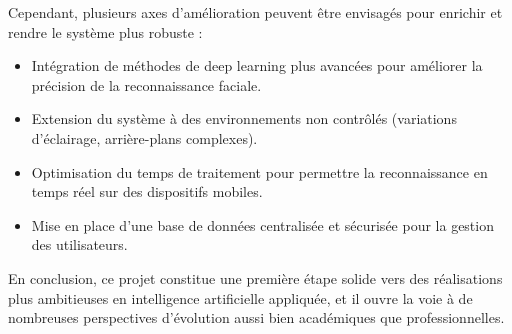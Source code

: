 \documentclass[a4paper,12pt]{report} %
\begin{document}
Cependant, plusieurs axes d'amélioration peuvent être envisagés pour enrichir et rendre le système plus robuste :

\begin{itemize}
    \item Intégration de méthodes de deep learning plus avancées pour améliorer la précision de la reconnaissance faciale.
    \item Extension du système à des environnements non contrôlés (variations d'éclairage, arrière-plans complexes).
    \item Optimisation du temps de traitement pour permettre la reconnaissance en temps réel sur des dispositifs mobiles.
    \item Mise en place d'une base de données centralisée et sécurisée pour la gestion des utilisateurs.
\end{itemize}

En conclusion, ce projet constitue une première étape solide vers des réalisations plus ambitieuses en intelligence artificielle appliquée, et il ouvre la voie à de nombreuses perspectives d'évolution aussi bien académiques que professionnelles.
\end{document}
